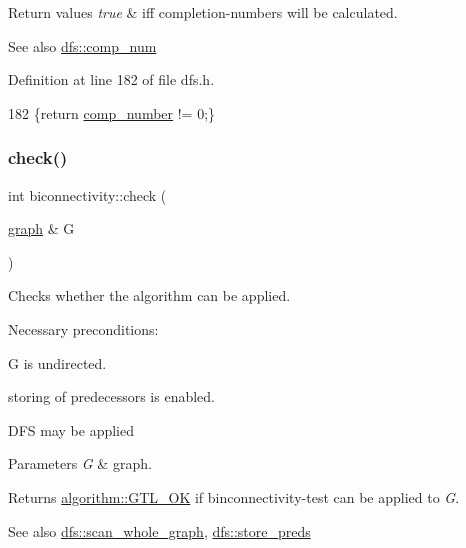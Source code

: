 \begin{DoxyRetVals}{Return values}
{\em true} & iff completion-\/numbers will be calculated. \\
\hline
\end{DoxyRetVals}
\begin{DoxySeeAlso}{See also}
\mbox{\hyperlink{classdfs_aceb066c806cb0beb5688b167a17387c7}{dfs\+::comp\+\_\+num}} 
\end{DoxySeeAlso}


Definition at line 182 of file dfs.\+h.


\begin{DoxyCode}
182 \{\textcolor{keywordflow}{return} \mbox{\hyperlink{classdfs_a00db016ac7eab69045cae408008890c1}{comp\_number}} != 0;\}
\end{DoxyCode}
\mbox{\label{classbiconnectivity_a65e0e821f5e9ce8d210648d462fd2cfa}} 
\subsubsection{\texorpdfstring{check()}{check()}}
{\footnotesize\ttfamily int biconnectivity\+::check (\begin{DoxyParamCaption}\item[{\mbox{\hyperlink{classgraph}{graph}} \&}]{G }\end{DoxyParamCaption})\hspace{0.3cm}{\ttfamily [virtual]}}



Checks whether the algorithm can be applied. 

Necessary preconditions\+:
\begin{DoxyItemize}
\item G is undirected.
\item storing of predecessors is enabled.
\item D\+FS may be applied
\end{DoxyItemize}


\begin{DoxyParams}{Parameters}
{\em G} & graph. \\
\hline
\end{DoxyParams}
\begin{DoxyReturn}{Returns}
\mbox{\hyperlink{classalgorithm_af1a0078e153aa99c24f9bdf0d97f6710a5114c20e4a96a76b5de9f28bf15e282b}{algorithm\+::\+G\+T\+L\+\_\+\+OK}} if binconnectivity-\/test can be applied to {\itshape G}. 
\end{DoxyReturn}
\begin{DoxySeeAlso}{See also}
\mbox{\hyperlink{classdfs_aa7c864a6f3a120720138b187b3ed95b5}{dfs\+::scan\+\_\+whole\+\_\+graph}}, \mbox{\hyperlink{classdfs_a7043f46eb3887cbcbb1391fc783407a4}{dfs\+::store\+\_\+preds}} 
\end{DoxySeeAlso}


